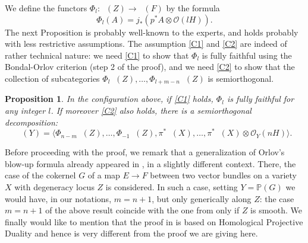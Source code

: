 \documentclass[11pt]{article}
\let\mathcal\mathscr
\theoremstyle{plain}
\newtheorem{prop}[theorem]{Proposition}
\theoremstyle{definition}
\newcommand{\cat}[1]{\mathsf{#1}}
\newcommand{\sod}[1]{\langle #1 \rangle}
\DeclareMathOperator{\Db}{{\cat{D}^{\mathrm{b}}}}
\newcommand{\PP}{\mathbb{P}}
\newcommand{\sheaf}[1]{\mathcal{#1}}
\newcommand{\ko}{\sheaf{O}}\let\OO\ko\let\cO\ko
\begin{document}
We define the functors $\Phi_l:\Db(Z) \to \Db(F)$ by the formula
\[
\Phi_l(A)= j_* (p^* A \otimes \ko(lH)).
\]
The next Proposition is probably well-known to the experts, and holds probably with less
restrictive assumptions. The assumption \eqref{C1} and \eqref{C2} are indeed of rather technical nature:
we need \eqref{C1} to show that $\Phi_l$ is fully faithful using the Bondal-Orlov
criterion (step 2 of the proof), and we need \eqref{C2} to show that the collection of subcategories
$\Phi_l \Db(Z),\ldots,\Phi_{l+m-n}\Db(Z)$ is semiorthogonal.\enlargethispage{\baselineskip}%

\begin{prop}\label{prop:main-sod}
In the configuration above, if \eqref{C1} holds, $\Phi_l$ is fully faithful for any integer $l$.
If moreover \eqref{C2} also holds, there is a semiorthogonal decomposition:
\[
\Db(Y)=\sod{\Phi_{n-m}\Db(Z),\ldots,\Phi_{-1}\Db(Z),\pi^*\Db(X),\ldots,\pi^*\Db(X)\otimes \ko_Y(nH)}.
\]
\end{prop}

Before proceeding with the proof, we remark that a generalization of Orlov's
blow-up formula already appeared in \cite{Jiang-Leung}, in a slightly different context. There, the
case of the cokernel $G$ of a map $E \to F$ between two vector bundles on a variety $X$ with degeneracy locus $Z$
is considered. In such a case, setting $Y=\PP(G)$ we would have, in our notations, $m=n+1$, but only generically
along $Z$: the case $m=n+1$ of the above result coincide with the one from \cite{Jiang-Leung}
only if $Z$ is smooth. We finally would like to mention that the proof in \cite{Jiang-Leung} is based
on Homological Projective Duality and hence is very different from the proof we are giving here.
\end{document}
